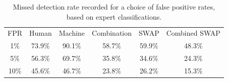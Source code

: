 \message{ !name(blank.tex)}\documentclass[a4paper,fleqn,usenatbib]{mnras}
\begin{document}

\begin{table}
\begin{minipage}{120mm}
\centering
\begin{tabular}{|c|c|c|c|c|c|}
FPR & Human & Machine & Combination & SWAP & Combined SWAP\\
1\% & 73.9\% & 90.1\% & 58.7\% & 59.9\% & 48.3\% \\
5\% & 56.3\% & 69.7\% & 35.8\% & 34.6\% & 24.3\%\\
10\% & 45.6\% & 46.7\% & 23.8\% & 26.2\% & 15.3\%\\
\end{tabular}
\caption{Missed detection rate recorded for a choice of false positive rates, based on expert classifications.}
\label{tab:roc_fpr}
\end{minipage}
\end{table}


\end{document}
